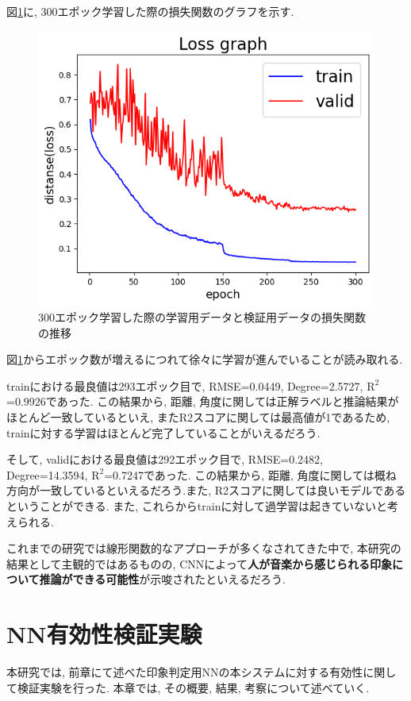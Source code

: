\documentclass[a4paper,11pt,dvipdfmx]{jreport}
\begin{document}
図\ref{result}に, 300エポック学習した際の損失関数のグラフを示す.

\begin{figure}[htbp]
  \centering
  \includegraphics[width=0.8\linewidth]{graph.png}
  \caption{300エポック学習した際の学習用データと検証用データの損失関数の推移}
  \label{result}
\end{figure}

図\ref{result}からエポック数が増えるにつれて徐々に学習が進んでいることが読み取れる.

trainにおける最良値は293エポック目で, RMSE=0.0449, Degree=2.5727, $\mathrm{R^2}$=0.9926であった. この結果から, 距離, 角度に関しては正解ラベルと推論結果がほとんど一致しているといえ, またR2スコアに関しては最高値が1であるため, trainに対する学習はほとんど完了していることがいえるだろう.

そして, validにおける最良値は292エポック目で, RMSE=0.2482, Degree=14.3594, $\mathrm{R^2}$=0.7247であった. この結果から, 距離, 角度に関しては概ね方向が一致しているといえるだろう.また, R2スコアに関しては良いモデルであるということができる.
また, これらからtrainに対して過学習は起きていないと考えられる.

これまでの研究では線形関数的なアプローチが多くなされてきた中で, 本研究の結果として主観的ではあるものの, CNNによって\textbf{人が音楽から感じられる印象について推論ができる可能性}が示唆されたといえるだろう.

\chapter{NN有効性検証実験}
本研究では, 前章にて述べた印象判定用NNの本システムに対する有効性に関して検証実験を行った.
本章では, その概要, 結果, 考察について述べていく.
\end{document}

